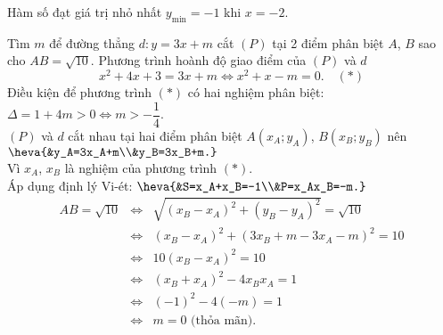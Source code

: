 \begin{bt}
{\begin{listEX}
{
			}
			Hàm số đạt giá trị nhỏ nhất $y_{\min}=-1$ khi $x=-2$.
			\item Tìm $m$ để đường thẳng $d\colon y=3x+m$ cắt $(P)$ tại 2 điểm phân biệt $A$, $B$ sao cho $AB=\sqrt{10}$.
			Phương trình hoành độ giao điểm của $(P)$ và $d$
			$$x^2+4x+3=3x+m\Leftrightarrow x^2+x-m=0.\quad(*)$$
			Điều kiện để phương trình $(*)$ có hai nghiệm phân biệt: $\Delta=1+4m>0\Leftrightarrow m>-\dfrac{1}{4}$.\\
			$(P)$ và $d$ cắt nhau tại hai điểm phân biệt $A\left(x_A;y_A\right)$, $B\left(x_B;y_B\right)$ nên $\heva{&y_A=3x_A+m\\&y_B=3x_B+m.}$\\
			Vì $x_A$, $x_B$ là nghiệm của phương trình $(*)$.\\
			Áp dụng định lý Vi-ét: $\heva{&S=x_A+x_B=-1\\&P=x_Ax_B=-m.}$\\
			\begin{eqnarray*}
				AB=\sqrt{10}&\Leftrightarrow&\sqrt{\left(x_B-x_A\right)^2+\left(y_B-y_A\right)^2}=\sqrt{10}\\
				&\Leftrightarrow& \left(x_B-x_A\right)^2+\left(3x_B+m-3x_A-m\right)^2=10\\
				&\Leftrightarrow& 10\left(x_B-x_A\right)^2=10\\
				&\Leftrightarrow& \left(x_B+x_A\right)^2-4x_Bx_A=1\\
				&\Leftrightarrow& (-1)^2-4(-m)=1\\
				&\Leftrightarrow& m=0\text{ (thỏa mãn).}
			\end{eqnarray*}
		\end{listEX}
	}
\end{bt}

